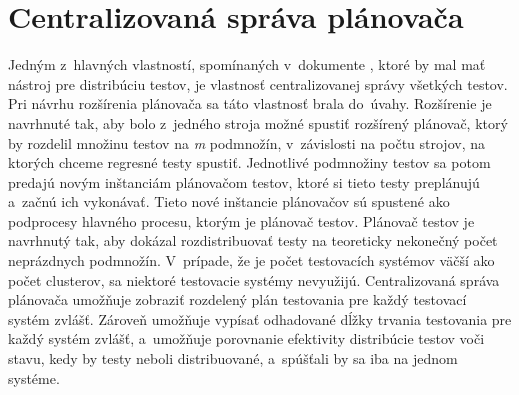 \section{Centralizovaná správa plánovača}
\label{sekcia:centralizovana_sprava}
Jedným z~hlavných vlastností, spomínaných v~dokumente 
\cite{Parallel_approach},  ktoré by mal mať nástroj pre distribúciu 
testov, je vlastnosť  centralizovanej správy všetkých testov. 
Pri návrhu rozšírenia plánovača sa táto vlastnosť brala do~úvahy. 
Rozšírenie je navrhnuté tak, aby bolo z~jedného stroja možné spustiť 
rozšírený plánovač, ktorý by rozdelil množinu 
testov na \emph{m} podmnožín, v~závislosti na počtu strojov, na ktorých 
chceme regresné testy spustiť. Jednotlivé podmnožiny testov sa 
potom predajú novým inštanciám plánovačom testov, ktoré si tieto testy 
preplánujú a~začnú ich vykonávať. 
Tieto nové inštancie plánovačov sú spustené ako podprocesy hlavného procesu, 
ktorým je plánovač testov.
Plánovač testov je navrhnutý tak, aby dokázal rozdistribuovať testy na 
teoreticky nekonečný počet neprázdnych podmnožín.
V~prípade, že je počet testovacích systémov väčší ako počet clusterov, 
sa niektoré testovacie systémy nevyužijú.
Centralizovaná správa plánovača umožňuje zobraziť rozdelený plán 
testovania pre každý testovací systém zvlášť. Zároveň umožňuje vypísať 
odhadované dĺžky trvania testovania pre každý systém zvlášť, a~umožňuje porovnanie 
efektivity distribúcie testov voči stavu, kedy by testy neboli 
distribuované, a~spúšťali by sa iba na jednom systéme. 

